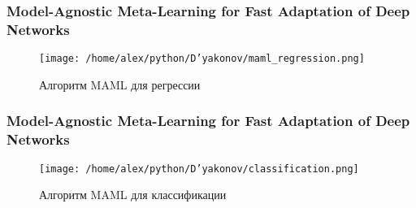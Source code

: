 \documentclass[fleqn, xcolor=x11names]{beamer}
\begin{document}
\begin{frame}\frametitle{Model-Agnostic Meta-Learning for Fast Adaptation of Deep Networks}

\begin{figure}[h]
\begin{center}
\texttt{[image: /home/alex/python/D'yakonov/maml\_regression.png]}
\caption{{\footnotesize  Алгоритм MAML для регрессии}}
\end{center}
\end{figure}

\end{frame}
\begin{frame}\frametitle{Model-Agnostic Meta-Learning for Fast Adaptation of Deep Networks}

\begin{figure}[h]
\begin{center}
\texttt{[image: /home/alex/python/D'yakonov/classification.png]}
\caption{ Алгоритм MAML для классификации}
\end{center}
\end{figure}

\end{frame}
\end{document}
